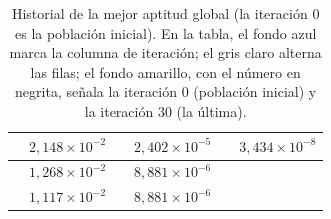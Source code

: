 \begin{table}[H]
\begin{tabular}{|c|c|c|c|c|c|}
\hline
\cellcolor{iteracion}{\bfseries\boldmath $8$} & $2{,}148\times10^{-2}$ & \cellcolor{iteracion}{\bfseries\boldmath $19$} & $2{,}402\times10^{-5}$ & \cellcolor{destacado}{\bfseries\boldmath $30$} & \cellcolor{destacado}$3{,}434\times10^{-8}$ \\
\hline
\cellcolor{iteracion}{\bfseries\boldmath $9$} & \cellcolor{cebra}$1{,}268\times10^{-2}$ & \cellcolor{iteracion}{\bfseries\boldmath $20$} & \cellcolor{cebra}$8{,}881\times10^{-6}$ & \cellcolor{cebra} & \cellcolor{cebra} \\
\hline
\cellcolor{iteracion}{\bfseries\boldmath $10$} & $1{,}117\times10^{-2}$ & \cellcolor{iteracion}{\bfseries\boldmath $21$} & $8{,}881\times10^{-6}$ &  &  \\
\hline
\end{tabular}
\caption{Historial de la mejor aptitud global (la iteración 0 es la población inicial). En la tabla, el fondo azul marca la columna de iteración; el gris claro alterna las filas; el fondo amarillo, con el número en negrita, señala la iteración 0 (población inicial) y la iteración 30 (la última).}
\label{tab:p5b-historial}
\end{table}
